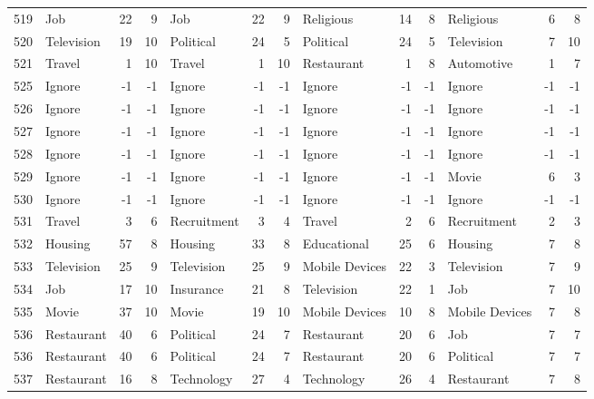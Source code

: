 \begin{figure}[htbp]
\begin{tabular}{rlrrlrrlrrlrr}
    519   & Job   & 22    & 9     & Job   & 22    & 9     & Religious & 14    & 8     & Religious & 6     & 8 \\
    520   & Television & 19    & 10    & Political & 24    & 5     & Political & 24    & 5     & Television & 7     & 10 \\
    521   & Travel & 1     & 10    & Travel & 1     & 10    & Restaurant & 1     & 8     & Automotive & 1     & 7 \\
    525   & Ignore & -1    & -1    & Ignore & -1    & -1    & Ignore & -1    & -1    & Ignore & -1    & -1 \\
    526   & Ignore & -1    & -1    & Ignore & -1    & -1    & Ignore & -1    & -1    & Ignore & -1    & -1 \\
    527   & Ignore & -1    & -1    & Ignore & -1    & -1    & Ignore & -1    & -1    & Ignore & -1    & -1 \\
    528   & Ignore & -1    & -1    & Ignore & -1    & -1    & Ignore & -1    & -1    & Ignore & -1    & -1 \\
    529   & Ignore & -1    & -1    & Ignore & -1    & -1    & Ignore & -1    & -1    & Movie & 6     & 3 \\
    530   & Ignore & -1    & -1    & Ignore & -1    & -1    & Ignore & -1    & -1    & Ignore & -1    & -1 \\
    531   & Travel & 3     & 6     & Recruitment & 3     & 4     & Travel & 2     & 6     & Recruitment & 2     & 3 \\
    532   & Housing & 57    & 8     & Housing & 33    & 8     & Educational & 25    & 6     & Housing & 7     & 8 \\
    533   & Television & 25    & 9     & Television & 25    & 9     & Mobile Devices & 22    & 3     & Television & 7     & 9 \\
    534   & Job   & 17    & 10    & Insurance & 21    & 8     & Television & 22    & 1     & Job   & 7     & 10 \\
    535   & Movie & 37    & 10    & Movie & 19    & 10    & Mobile Devices & 10    & 8     & Mobile Devices & 7     & 8 \\
    536   & Restaurant & 40    & 6     & Political & 24    & 7     & Restaurant & 20    & 6     & Job   & 7     & 7 \\
    536   & Restaurant & 40    & 6     & Political & 24    & 7     & Restaurant & 20    & 6     & Political & 7     & 7 \\
    537   & Restaurant & 16    & 8     & Technology & 27    & 4     & Technology & 26    & 4     & Restaurant & 7     & 8 \\

\end{tabular}
\end{figure}
